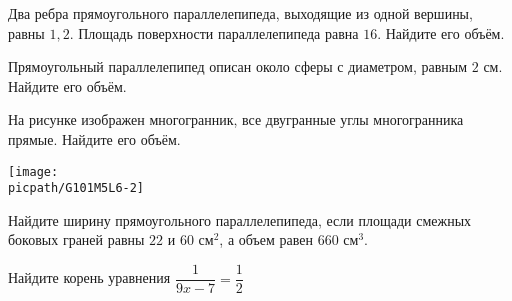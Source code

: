 \begin{homework}[number=3]
	\begin{listofex}
		\item Два ребра прямоугольного параллелепипеда, выходящие из одной вершины, равны \(1, 2\). Площадь поверхности параллелепипеда равна \(16\). Найдите его объём.
		\item Прямоугольный параллелепипед описан около сферы с диаметром, равным \(2\) см. Найдите его объём.
		\item 
		\begin{minipage}[t]{\bodywidth}
			На рисунке изображен многогранник, все двугранные углы многогранника прямые. Найдите его объём.
		\end{minipage}
		\hspace{0.02\linewidth}
		\begin{minipage}[t]{\picwidth}
			\texttt{[image: \\picpath/G101M5L6-2]}
		\end{minipage}
		\item Найдите ширину прямоугольного параллелепипеда, если площади смежных боковых граней равны \(22\) и \(60\) см\(^2\), а объем равен \(660\) см\(^3\).
		\item Найдите корень уравнения \(\dfrac{1}{9x-7}=\dfrac{1}{2}\)
	\end{listofex}
\end{homework}

